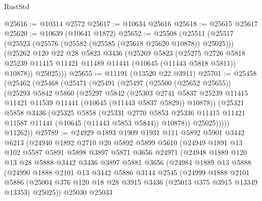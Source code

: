 \begin{lexlean}{RustStd}
\begin{coremodule}
@25616 := @10314 @2572
@25617 := @10634 @25616
@25618 := @25615 @25617
@25620 := @10639 (@10641 @1872)
@25652 := @25508
    (@25511
      (@25517
        (@25523 (@25576 (@25582 (@25585 (@25618 @25620 @10878)) @25025)))
        (@25262
          @120
          @22
          @28
          @5823
          @3436
          (@25269
            @5823
            (@25275
              @2726
              @5818
              @25239
              @11415
              @11421
              @11489
              @11441
              (@10645 (@11443 @5818 @5811))
              @10878))
          @25025)))
@25655 := @11191 (@13520 @22 @3911)
@25701 := @25458
    (@25462
      (@25468
        (@25471
          (@25491
            (@25497
              (@25500 (@25652 @25655))
              (@25293
                @5842
                @5860
                (@25297
                  @5842
                  (@25303
                    @2741
                    @5837
                    @25239
                    @11415
                    @11421
                    @11539
                    @11441
                    (@10645 (@11443 @5837 @5829))
                    @10878))
                (@25321
                  @5858
                  @3436
                  (@25325
                    @5858
                    (@25331
                      @2770
                      @5853
                      @25336
                      @11415
                      @11421
                      @11587
                      @11441
                      (@10645 (@11443 @5853 @5844))
                      @10878))
                  @25025)))))
        @11262))
@25789 := @24929
    @1893
    @1909
    @1931
    @111
    @5892
    @5901
    @3442
    @6213
    (@24940
      @1892
      @2710
      @20
      @5892
      @5899
      @5610
      (@24949
        @1891
        @13
        @102
        @5587
        @5891
        @5898
        @3897
        @5871
        @3656
        @24971
        (@24948
          @1889
          @120
          @13
          @28
          @5888
          @3442
          @3436
          @3897
          @5881
          @3656
          (@24984
            @1889
            @13
            @5888
            (@24990
              @1888
              @2101
              @13
              @3442
              @5886
              @3144
              @2545
              (@24999
                @1888
                @2101
                @5886
                (@25004 @376 @120 @18 @28 @3915 @3436 (@25013 @375 @3915 @13349 @13353) @25025))
              @25030
              @25033

\end{coremodule}
\end{lexlean}
